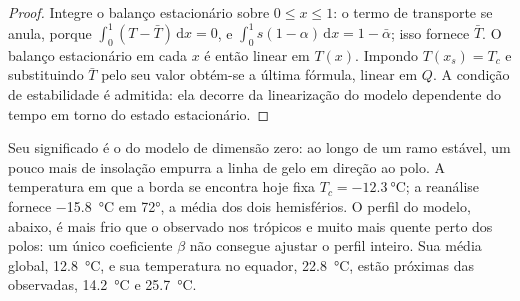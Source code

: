\begin{proof}
Integre o balanço estacionário sobre $0 \le x \le 1$: o termo de transporte
se anula, porque $\int_0^1(T - \bar T)\,\mathrm dx = 0$, e $\int_0^1
s(1 - \alpha)\,\mathrm dx = 1 - \bar\alpha$; isso fornece $\bar T$. O
balanço estacionário em cada $x$ é então linear em $T(x)$. Impondo $T(x_s) = T_c$
e substituindo $\bar T$ pelo seu valor obtém-se a última fórmula, linear em $Q$.
A condição de estabilidade é admitida: ela decorre da linearização do
modelo dependente do tempo em torno do estado estacionário.
\end{proof}

Seu significado é o do modelo de dimensão zero: ao longo de um ramo estável,
um pouco mais de insolação empurra a linha de gelo em direção ao polo. A temperatura em
que a borda se encontra hoje fixa $T_c = \qty{-12.3}{\celsius}$; a
reanálise fornece \qty{-15.8}{\celsius} em \ang{72}, a média dos dois
hemisférios. O perfil do modelo, abaixo, é mais frio que o observado nos
trópicos e muito mais quente perto dos polos: um único coeficiente $\beta$ não
consegue ajustar o perfil inteiro. Sua média global,
\qty{12.8}{\celsius}, e sua temperatura no equador, \qty{22.8}{\celsius}, estão próximas
das observadas, \qty{14.2}{\celsius} e \qty{25.7}{\celsius}.

